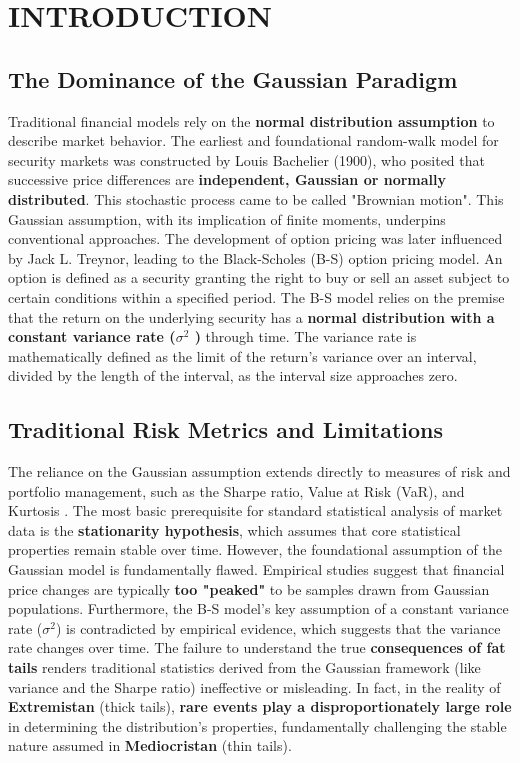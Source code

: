 \documentclass{ieeetj}
\begin{document}
\section{INTRODUCTION}
\subsection{The Dominance of the Gaussian Paradigm}
Traditional financial models rely on the \textbf{normal distribution assumption} to describe market behavior. The earliest and foundational random-walk model for security markets was constructed by Louis Bachelier (1900)\cite{mandelbrot1963variation}, who posited that successive price differences are \textbf{independent, Gaussian or normally distributed}\cite{mandelbrot1963variation}. This stochastic process came to be called "Brownian motion"\cite{mandelbrot1963variation}. This Gaussian assumption, with its implication of finite moments, underpins conventional approaches. The development of option pricing was later influenced by Jack L. Treynor, leading to the Black-Scholes\cite{blackscholes1973} (B-S) option pricing model. An option is defined as a security granting the right to buy or sell an asset subject to certain conditions within a specified period. The B-S model relies on the premise that the return on the underlying security has a \textbf{normal distribution with a constant variance rate ($\sigma^2$
 )} through time. The variance rate is mathematically defined as the limit of the return's variance over an interval, divided by the length of the interval, as the interval size approaches zero.

\subsection{Traditional Risk Metrics and Limitations}
The reliance on the Gaussian assumption extends directly to measures of risk and portfolio management, such as the Sharpe ratio, Value at Risk (VaR), and Kurtosis \cite{taleb2025}. The most basic prerequisite for standard statistical analysis of market data is the\textbf{ stationarity hypothesis}, which assumes that core statistical properties remain stable over time. However, the foundational assumption of the Gaussian model is fundamentally flawed. Empirical studies suggest that financial price changes are typically \textbf{too "peaked"} to be samples drawn from Gaussian populations. Furthermore, the B-S model's key assumption of a constant variance rate ($\sigma^2$) is contradicted by empirical evidence, which suggests that the variance rate changes over time. The failure to understand the true \textbf{consequences of fat tails} renders traditional statistics derived from the Gaussian framework (like variance and the Sharpe ratio) ineffective or misleading. In fact, in the reality of \textbf{Extremistan} (thick tails), \textbf{rare events play a disproportionately large role} in determining the distribution's properties, fundamentally challenging the stable nature assumed in \textbf{Mediocristan} (thin tails).
\end{document}
